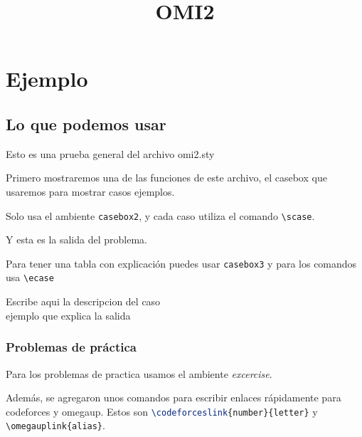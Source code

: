 \documentclass[b5paper,12pt]{book}
\begin{document}
	
	\author{}
	\title{OMI2}
	\date{}
	
	\frontmatter
	\maketitle
	
	\tableofcontents
	
	
	\mainmatter
	\part{Ejemplo}

	\chapter{Lo que podemos usar}
	Esto es una prueba general del archivo omi2.sty
	
	Primero mostraremos una de las funciones de este archivo, el casebox que usaremos para mostrar casos ejemplos.
	
	Solo usa el ambiente \lstinline|casebox2|, y cada caso utiliza el comando \lstinline|\scase|.
	
	\begin{casebox2}
		 {
			Y esta es la salida del problema.
		}
	\end{casebox2}

	Para tener una tabla con explicación puedes usar \lstinline|casebox3| y para los comandos usa \lstinline|\ecase|
	
	\begin{casebox3}
		 {
			Escribe aqui la descripcion del caso \\
			ejemplo que explica la salida
		}
	\end{casebox3}
	
	\section{Problemas de práctica}
	
	Para los problemas de practica usamos el ambiente \textit{excercise}.
	
	Además, se agregaron unos comandos para escribir enlaces rápidamente para codeforces y omegaup. Estos son \lstinline[language=tex]|\codeforceslink{number}{letter}| y \lstinline|\omegauplink{alias}|.
	
\end{document}
